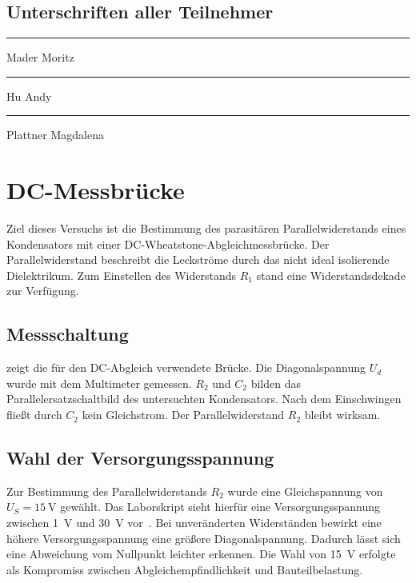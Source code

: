 \documentclass[11pt,a4paper]{scrartcl}
\begin{document}
\subsection{Unterschriften aller Teilnehmer}
\vspace{16mm}
\noindent
\begin{minipage}[t]{0.30\linewidth}
  \hrule\vspace{3mm}
  Mader Moritz
\end{minipage}\hfill
\begin{minipage}[t]{0.30\linewidth}
  \hrule\vspace{3mm}
  Hu Andy
\end{minipage}\hfill
\begin{minipage}[t]{0.30\linewidth}
  \hrule\vspace{3mm}
  Plattner Magdalena
\end{minipage}

\clearpage
\section{DC-Messbrücke}
Ziel dieses Versuchs ist die Bestimmung des parasitären Parallelwiderstands eines Kondensators mit einer DC-Wheatstone-Abgleichmessbrücke.
Der Parallelwiderstand beschreibt die Leckströme durch das nicht ideal isolierende Dielektrikum.
Zum Einstellen des Widerstands $R_1$ stand eine Widerstandsdekade zur Verfügung.

\subsection{Messschaltung}
 zeigt die für den DC-Abgleich verwendete Brücke. Die Diagonalspannung $U_d$ wurde mit dem Multimeter gemessen.
$R_2$ und $C_2$ bilden das Parallelersatzschaltbild des untersuchten Kondensators.
Nach dem Einschwingen fließt durch $C_2$ kein Gleichstrom. Der Parallelwiderstand $R_2$ bleibt wirksam.




\subsection{Wahl der Versorgungsspannung}
Zur Bestimmung des Parallelwiderstands $R_2$ wurde eine Gleichspannung von $U_S = \SI{15}{\volt}$ gewählt.
Das Laborskript sieht hierfür eine Versorgungsspannung zwischen \SI{1}{\volt} und \SI{30}{\volt} vor~\cite{laborskript}.
Bei unveränderten Widerständen bewirkt eine höhere Versorgungsspannung eine größere Diagonalspannung.
Dadurch lässt sich eine Abweichung vom Nullpunkt leichter erkennen.
Die Wahl von \SI{15}{\volt} erfolgte als Kompromiss zwischen Abgleichempfindlichkeit und Bauteilbelastung.
\end{document}
